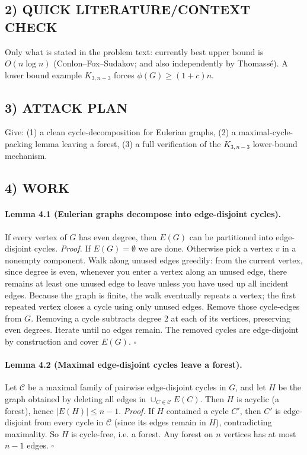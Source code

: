 \subsection*{2) QUICK LITERATURE/CONTEXT CHECK}
Only what is stated in the problem text: currently best upper bound is $O(n\log n)$ (Conlon--Fox--Sudakov; and also
independently by Thomass\'e). A lower bound example $K_{3,n-3}$ forces $\phi(G)\ge (1+c)n$.

\subsection*{3) ATTACK PLAN}
Give:
(1) a clean cycle-decomposition for Eulerian graphs,
(2) a maximal-cycle-packing lemma leaving a forest,
(3) a full verification of the $K_{3,n-3}$ lower-bound mechanism.

\subsection*{4) WORK}

\paragraph{Lemma 4.1 (Eulerian graphs decompose into edge-disjoint cycles).}
If every vertex of $G$ has even degree, then $E(G)$ can be partitioned into edge-disjoint cycles.
\textit{Proof.}
If $E(G)=\emptyset$ we are done. Otherwise pick a vertex $v$ in a nonempty component.
Walk along unused edges greedily: from the current vertex, since degree is even, whenever you enter a vertex along an unused edge,
there remains at least one unused edge to leave unless you have used up all incident edges. Because the graph is finite, the walk
eventually repeats a vertex; the first repeated vertex closes a cycle using only unused edges. Remove those cycle-edges from $G$.
Removing a cycle subtracts degree $2$ at each of its vertices, preserving even degrees. Iterate until no edges remain.
The removed cycles are edge-disjoint by construction and cover $E(G)$. \hfill$\square$

\paragraph{Lemma 4.2 (Maximal edge-disjoint cycles leave a forest).}
Let $\mathcal{C}$ be a maximal family of pairwise edge-disjoint cycles in $G$, and let $H$ be the graph obtained by deleting all edges
in $\cup_{C\in\mathcal{C}}E(C)$. Then $H$ is acyclic (a forest), hence $|E(H)|\le n-1$.
\textit{Proof.}
If $H$ contained a cycle $C'$, then $C'$ is edge-disjoint from every cycle in $\mathcal{C}$ (since its edges remain in $H$), contradicting maximality.
So $H$ is cycle-free, i.e. a forest. Any forest on $n$ vertices has at most $n-1$ edges. \hfill$\square$

